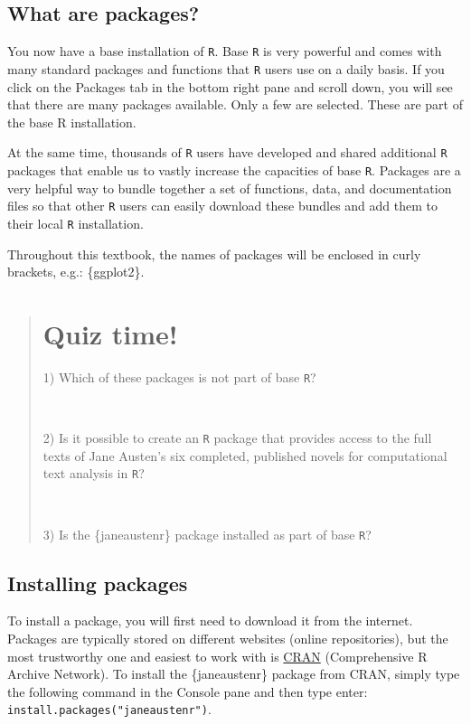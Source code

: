 \documentclass[
  letterpaper,
  DIV=11,
  numbers=noendperiod,
  oneside]{scrreprt}
\begin{document}
\subsection{What are packages?}\label{what-are-packages}

You now have a base installation of \texttt{R}. Base \texttt{R} is very
powerful and comes with many standard packages and functions that
\texttt{R} users use on a daily basis. If you click on the Packages tab
in the bottom right pane and scroll down, you will see that there are
many packages available. Only a few are selected. These are part of the
base R installation.

At the same time, thousands of \texttt{R} users have developed and
shared additional \texttt{R} packages that enable us to vastly increase
the capacities of base \texttt{R}. Packages are a very helpful way to
bundle together a set of functions, data, and documentation files so
that other \texttt{R} users can easily download these bundles and add
them to their local \texttt{R} installation.

Throughout this textbook, the names of packages will be enclosed in
curly brackets, e.g.: \{ggplot2\}.

\begin{quote}
\section*{Quiz time!}\label{quiz-time-1}


1) Which of these packages is not part of base \texttt{R}?

~

2) Is it possible to create an \texttt{R} package that provides access
to the full texts of Jane Austen's six completed, published novels for
computational text analysis in \texttt{R}?

~

3) Is the \{janeaustenr\} package installed as part of base \texttt{R}?
\end{quote}

\subsection{Installing packages}\label{installing-packages}

To install a package, you will first need to download it from the
internet. Packages are typically stored on different websites (online
repositories), but the most trustworthy one and easiest to work with is
\href{https://cran.rstudio.com/index.html}{CRAN} (Comprehensive R
Archive Network). To install the \{janeaustenr\} package from CRAN,
simply type the following command in the Console pane and then type
enter: \texttt{install.packages("janeaustenr")}.
\end{document}
